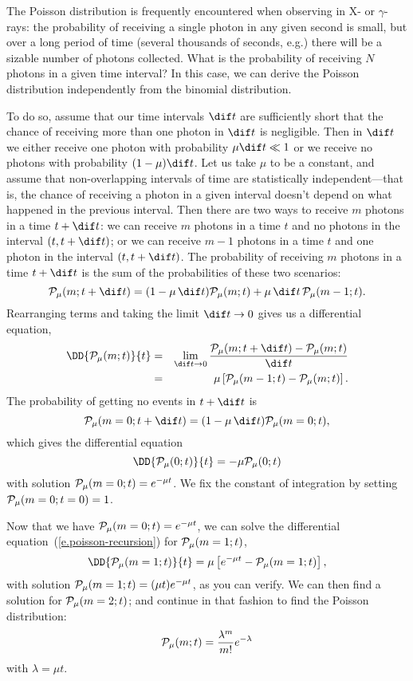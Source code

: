 \begin{sidebar}
The Poisson distribution is frequently encountered when observing in X- or $\gamma$-rays: the probability of receiving a single photon in any given second is small, but over a long period of time (several thousands of seconds, e.g.) there will be a sizable number of photons collected.  What is the probability of receiving $N$ photons in a given time interval? In this case, we can derive the Poisson distribution independently from the binomial distribution.

To do so, assume that our time intervals $\dif t$ are sufficiently short that the chance of receiving more than one photon in $\dif t$ is negligible.  Then in $\dif t$ we either receive one photon with probability $\mu\dif t \ll 1$ or we receive no photons with probability $(1-\mu)\dif t$.  Let us take $\mu$ to be a constant, and assume that non-overlapping intervals of time are statistically independent---that is, the chance of receiving a photon in a given interval doesn't depend on what happened in the previous interval. Then there are two ways to receive $m$ photons in a time $t+\dif t$: we can receive $m$ photons in a time $t$ and no photons in the interval $(t,t+\dif t)$; or we can receive $m-1$ photons in a time $t$ and one photon in the interval $(t,t+\dif t)$.  The probability of receiving $m$ photons in a time $t+\dif t$ is the sum of the probabilities of these two scenarios:
\[
	\prob_{\mu}(m;t+\dif t) = (1-\mu\,\dif t)\prob_{\mu}(m;t) + \mu\,\dif t\, \prob_{\mu}(m-1;t).
\]
Rearranging terms and taking the limit $\dif t \to 0$ gives us a differential equation,
\begin{eqnarray}
\DD{\prob_{\mu}(m;t)}{t} &=& \lim_{\dif t\to 0} \frac{\prob_{\mu}(m;t+\dif t)-\prob_{\mu}(m;t)}{\dif t} \nonumber\\
&=& \mu\left[\prob_{\mu}(m-1;t)-\prob_{\mu}(m;t)\right].
\label{e.poisson-recursion}
\end{eqnarray}
The probability of getting no events in $t+\dif t$ is
\[ \prob_{\mu}(m=0;t+\dif t) = (1-\mu\,\dif t)\prob_{\mu}(m=0;t), \]
which gives the differential equation
\[ \DD{\prob_{\mu}(0;t)}{t} = -\mu\prob_{\mu}(0;t) \]
with solution $\mathcal{P}_{\mu}(m=0;t) = e^{-\mu t}$.  We fix the constant of integration by setting $\mathcal{P}_{\mu}(m=0;t=0) = 1$.

Now that we have $\mathcal{P}_{\mu}(m=0;t) = e^{-\mu t}$, we can solve the differential equation~(\ref{e.poisson-recursion}) for $\mathcal{P}_{\mu}(m=1;t)$,
\[ \DD{\prob_{\mu}(m=1;t)}{t} = \mu\left[e^{-\mu t} - \prob_{\mu}(m=1;t)\right], \]
with solution $\mathcal{P}_{\mu}(m=1;t) = (\mu t)e^{-\mu t}$, as you can verify.  We can then find a solution for $\mathcal{P}_{\mu}(m=2;t)$; and continue in that fashion to find the Poisson distribution:
\begin{equation}\label{e.Poisson-alt}
	\mathcal{P}_{\mu}(m;t) = \frac{\lambda^{m}}{m!} e^{-\lambda}
\end{equation}
with $\lambda=\mu t$.


\end{sidebar}
